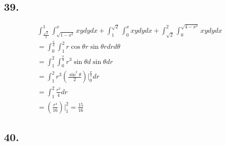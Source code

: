 \documentclass{article}
\begin{document}
  \subsection*{39. }

  $$\begin{aligned}
    &\int_{\frac{\sqrt 2}{2}}^1 \int_{\sqrt{1-x^2}}^x xy dy dx + \int_1^{\sqrt 2} \int_0^x xy dy dx + \int_{\sqrt 2}^2 \int_0^{\sqrt{4-x^2}} xy dy dx \\
    &= \int_0^{\frac \pi 4} \int_1^2 r\cos \theta r \sin \theta r dr d\theta \\
    &= \int_1^2 \int_0^{\frac \pi 4} r^3 \sin \theta d\sin \theta dr \\
    &= \int_1^2 r^3 (\frac{\sin^2 \theta}{2})\biggl|_0^{\frac \pi 4} dr \\
    &= \int_1^2 \frac{r^3}{4} dr \\
    &= (\frac{r^4}{16})\biggl|_1^2 = \frac{15}{16}
  \end{aligned}$$

  \subsection*{40. }
\end{document}
